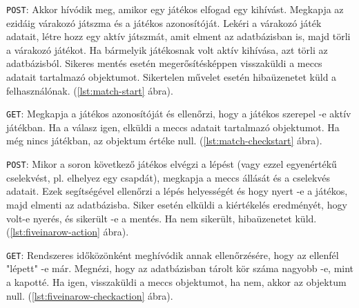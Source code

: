 

\texttt{POST}: Akkor hívódik meg, amikor egy játékos elfogad egy kihívást. Megkapja az ezidáig várakozó játszma és a játékos azonosítóját. Lekéri a várakozó játék adatait, létre hozz egy aktív játszmát, amit elment az adatbázisban is, majd törli a várakozó játékot. Ha bármelyik játékosnak volt aktív kihívása, azt törli az adatbázisból.
Sikeres mentés esetén megerősítésképpen visszaküldi a meccs adatait tartalmazó objektumot.
Sikertelen művelet esetén hibaüzenetet küld a felhasználónak. (\ref{lst:match-start} ábra).



\texttt{GET}: Megkapja a játékos azonosítóját és ellenőrzi, hogy a játékos szerepel -e aktív játékban. Ha a válasz igen, elküldi a meccs adatait tartalmazó objektumot. Ha még nincs játékban, az objektum értéke null. (\ref{lst:match-checkstart} ábra).




\texttt{POST}: Mikor a soron következő játékos elvégzi a lépést (vagy ezzel egyenértékű cselekvést, pl. elhelyez egy csapdát), megkapja a meccs állását és a cselekvés adatait. Ezek segítségével ellenőrzi a lépés helyességét és hogy nyert -e a játékos, majd elmenti az adatbázisba.
Siker esetén elküldi a kiértékelés eredményét, hogy volt-e nyerés, és sikerült -e a mentés. Ha nem sikerült, hibaüzenetet küld. (\ref{lst:fiveinarow-action} ábra).



\texttt{GET}: Rendszeres időközönként meghívódik annak ellenőrzésére, hogy az ellenfél "lépett" -e már. Megnézi, hogy az adatbázisban tárolt kör száma nagyobb -e, mint a kapotté. Ha igen, visszaküldi a meccs objektumot, ha nem, akkor az objektum null. (\ref{lst:fiveinarow-checkaction} ábra).



